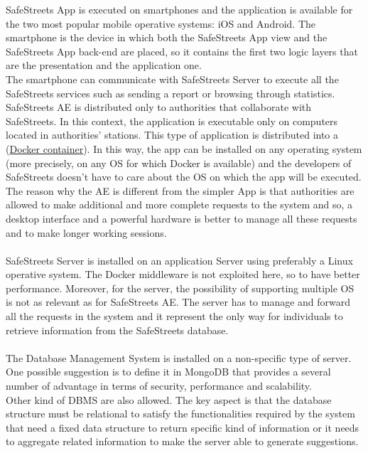 \documentclass{article}
\begin{document}
   		SafeStreets App is executed on smartphones and the application is available for the two most popular mobile operative systems: iOS and Android.
   		The smartphone is the device in which both the SafeStreets App view and the SafeStreets App back-end are placed, so it contains the first two logic layers that are the presentation and the application one.\\
   		The smartphone can communicate with SafeStreets Server to execute all the SafeStreets services such as sending a report or browsing through statistics.\\
   		SafeStreets AE is distributed only to authorities that collaborate with SafeStreets. In this context, the application is executable only on computers located in authorities' stations. This type of application is distributed into a (\href{https://www.docker.io}{Docker container}). In this way, the app can be installed on any operating system (more precisely, on any OS for which Docker is available) and the developers of SafeStreets doesn't have to care about the OS on which the app will be executed.\\
   		The reason why the AE is different from the simpler App is that authorities are allowed to make additional and more complete requests to the system and so, a desktop interface and a powerful hardware is better to manage all these requests and to make longer working sessions.\\
   		\\
   		SafeStreets Server is installed on an application Server using preferably a Linux operative system. The Docker middleware is not exploited here, so to have better performance. Moreover, for the server, the possibility of supporting multiple OS is not as relevant as for SafeStreets AE. The server has to manage and forward all the requests in the system and it represent the only way for individuals to retrieve information from the SafeStreets database.\\
   		\\
   		The Database Management System is installed on a non-specific type of server. One possible suggestion is to define it in MongoDB that provides a several number of advantage in terms of security, performance and scalability.\\
   		Other kind of DBMS are also allowed. The key aspect is that the database structure must be relational to satisfy the functionalities required by the system that need a fixed data structure to return specific kind of information or it needs to aggregate related information to make the server able to generate suggestions.
		
\end{document}
